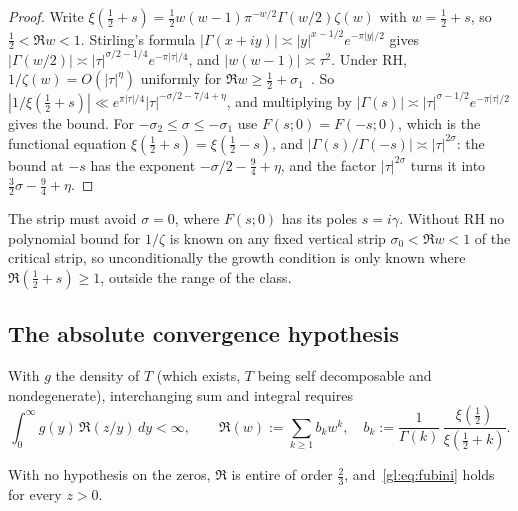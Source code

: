 \begin{proof}
Write $\xi(\tfrac12+s)=\tfrac12 w(w-1)\pi^{-w/2}\Gamma(w/2)\zeta(w)$ with $w=\tfrac12+s$, so $\tfrac12<\Re w<1$. Stirling's formula $|\Gamma(x+iy)|\asymp|y|^{x-1/2}e^{-\pi|y|/2}$ gives $|\Gamma(w/2)|\asymp|\tau|^{\sigma/2-1/4}e^{-\pi|\tau|/4}$, and $|w(w-1)|\asymp\tau^2$. Under RH, $1/\zeta(w)=O(|\tau|^\eta)$ uniformly for $\Re w\ge\tfrac12+\sigma_1$~\cite[Section~14.2]{Titchmarsh}. So $|1/\xi(\tfrac12+s)|\ll e^{\pi|\tau|/4}|\tau|^{-\sigma/2-7/4+\eta}$, and multiplying by $|\Gamma(s)|\asymp|\tau|^{\sigma-1/2}e^{-\pi|\tau|/2}$ gives the bound. For $-\sigma_2\le\sigma\le-\sigma_1$ use $F(s;0)=F(-s;0)$, which is the functional equation $\xi(\tfrac12+s)=\xi(\tfrac12-s)$, and $|\Gamma(s)/\Gamma(-s)|\asymp|\tau|^{2\sigma}$: the bound at $-s$ has the exponent $-\sigma/2-\tfrac94+\eta$, and the factor $|\tau|^{2\sigma}$ turns it into $\tfrac32\sigma-\tfrac94+\eta$.
\end{proof}

The strip must avoid $\sigma=0$, where $F(s;0)$ has its poles $s=i\gamma$. Without RH no polynomial bound for $1/\zeta$ is known on any fixed vertical strip $\sigma_0<\Re w<1$ of the critical strip, so unconditionally the growth condition is only known where $\Re(\tfrac12+s)\ge1$, outside the range of the class.

\subsection{The absolute convergence hypothesis}

With $g$ the density of $T$ (which exists, $T$ being self decomposable and nondegenerate), interchanging sum and integral requires
\begin{equation}\label{gl:eq:fubini}
\int_0^\infty g(y)\,\mathfrak R(z/y)\,dy < \infty,\qquad \mathfrak R(w):=\sum_{k\ge1}b_kw^k,\quad b_k:=\frac{1}{\Gamma(k)}\,\frac{\xi(\tfrac12)}{\xi(\tfrac12+k)}.
\end{equation}

\begin{lemma}\label{gl:lem:fubini}
With no hypothesis on the zeros, $\mathfrak R$ is entire of order $\tfrac23$, and~\eqref{gl:eq:fubini} holds for every $z>0$.
\end{lemma}

